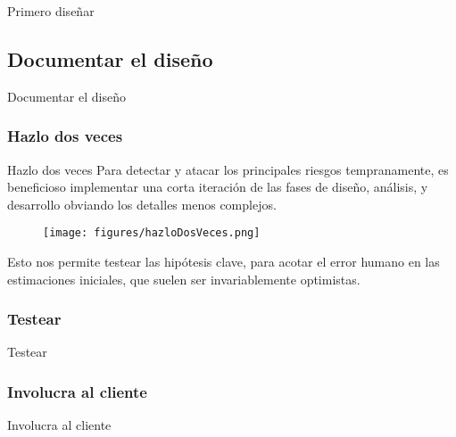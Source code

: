 \documentclass{beamer}
\begin{document}
\begin{frame}{Primero diseñar}

\end{frame}

\subsection{Documentar el diseño}

\begin{frame}{Documentar el diseño}

\end{frame}

\subsubsection{Hazlo dos veces}
\begin{frame}{Hazlo dos veces}
Para detectar y atacar los principales riesgos tempranamente, es beneficioso implementar una corta iteración de las fases de diseño, análisis, y desarrollo obviando los detalles menos complejos.

\begin{figure}
\texttt{[image: figures/hazloDosVeces.png]}
\end{figure}

Esto nos permite testear las hipótesis clave, para acotar el error humano en las estimaciones iniciales, que suelen ser invariablemente optimistas.



\end{frame}

\subsubsection{Testear}

\begin{frame}{Testear}

\end{frame}


\subsubsection{Involucra al cliente}

\begin{frame}{Involucra al cliente}

\end{frame}
\end{document}
